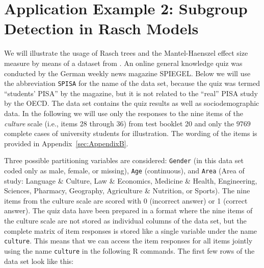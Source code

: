 \documentclass[doc,floatsintext,natbib]{apa7}
\newcommand{\edc}[1]{\textcolor{blue}{#1}}
\begin{document}






\newpage
\FloatBarrier
\section{Application Example 2: Subgroup Detection in Rasch Models}
\label{sec:TutorialRasch}


We will illustrate the usage of Rasch trees and the Mantel-Haenszel effect size measure by means of a dataset from \citet{SPISA:book}. An online general knowledge quiz was conducted by the German
weekly news magazine SPIEGEL. Below we will use the abbreviation \texttt{SPISA} for the name of the data set, because the quiz was termed ``students' PISA'' by the magazine, but it is not related to the ``real'' PISA study by the OECD. The data set contains the quiz results as well as sociodemographic data. In the following we will use only the responses to the nine items of the \textit{culture} scale (i.e., items 28 through 36) from test booklet 20 and only the $9769$ complete cases of university students for illustration. The wording of the items is provided in Appendix~\ref{sec:AppendixB}. 

Three possible partitioning variables are considered: \texttt{Gender} (in this data set coded only as male, female, or missing), \texttt{Age} (continuous), and \texttt{Area} (Area of study: Language \& Culture, Law \& Economics, Medicine \& Health, Engineering, Sciences, Pharmacy, Geography, Agriculture \& Nutrition, or Sports). The nine items from the culture scale are scored with 0 (incorrect answer) or 1 (correct answer). 
The quiz data have been prepared in a format where the nine items of the culture scale are not stored as individual columns of the data set, but the complete matrix of item responses is stored like a single variable \citep[see][]{raschtree:vignette} under the name \texttt{culture}. This means that we can access the item responses for all items jointly using the name \texttt{culture} in the following R commands. The first few rows of the data set look like this:
\end{document}
